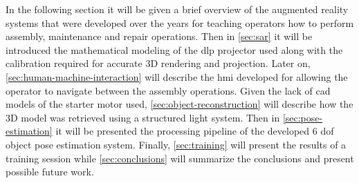 In the following section it will be given a brief overview of the augmented reality systems that were developed over the years for teaching operators how to perform assembly, maintenance and repair operations. Then in \cref{sec:sar} it will be introduced the mathematical modeling of the \gls{dlp} projector used along with the calibration required for accurate 3D rendering and projection. Later on, \cref{sec:human-machine-interaction} will describe the \gls{hmi} developed for allowing the operator to navigate between the assembly operations. Given the lack of \gls{cad} models of the starter motor used, \cref{sec:object-reconstruction} will describe how the 3D model was retrieved using a structured light system. Then in \cref{sec:pose-estimation} it will be presented the processing pipeline of the developed 6 \gls{dof} object pose estimation system. Finally, \cref{sec:training} will present the results of a training session while \cref{sec:conclusions} will summarize the conclusions and present possible future work.
